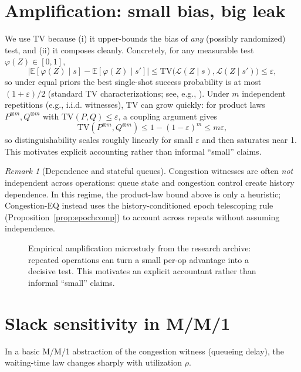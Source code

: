\documentclass[11pt]{article}
\theoremstyle{definition}
\theoremstyle{remark}
\newtheorem{remark}{Remark}
\newcommand{\TV}{\mathrm{TV}}
\newcommand{\eps}{\varepsilon}
\newcommand{\E}{\mathbb{E}}
\begin{document}
\section{Amplification: small bias, big leak}\label{sec:amplification}
We use TV because (i) it upper-bounds the bias of \emph{any} (possibly randomized) test, and (ii) it composes cleanly.
Concretely, for any measurable test $\varphi(Z)\in[0,1]$,
\[
\big|\E[\varphi(Z)\mid s]-\E[\varphi(Z)\mid s']\big| \le \TV\big(\mathcal{L}(Z\mid s),\mathcal{L}(Z\mid s')\big) \le \eps,
\]
so under equal priors the best single-shot success probability is at most $(1+\eps)/2$ (standard TV characterizations; see, e.g., \cite{levin_peres_wilmer}).
Under $m$ independent repetitions (e.g., i.i.d. witnesses), TV can grow quickly: for product laws $P^{\otimes m},Q^{\otimes m}$ with $\TV(P,Q)\le \eps$, a coupling argument gives
\[\TV(P^{\otimes m},Q^{\otimes m}) \le 1-(1-\eps)^m \le m\eps,\]
so distinguishability scales roughly linearly for small $\eps$ and then saturates near 1.
This motivates explicit accounting rather than informal ``small'' claims.

\begin{remark}[Dependence and stateful queues]
Congestion witnesses are often \emph{not} independent across operations: queue state and congestion control create history dependence.
In this regime, the product-law bound above is only a heuristic; Congestion-EQ instead uses the history-conditioned epoch telescoping rule (Proposition~\ref{prop:epochcomp}) to account across repeats without assuming independence.
\end{remark}

\begin{figure}[t]
\centering
{}
\caption{Empirical amplification microstudy from the research archive: repeated operations can turn a small per-op advantage into a decisive test.
This motivates an explicit accountant rather than informal ``small'' claims.}
\label{fig:amplification}
\end{figure}

\section{Slack sensitivity in M/M/1}
In a basic M/M/1 abstraction of the congestion witness (queueing delay), the waiting-time law changes sharply with utilization $\rho$.
\end{document}
